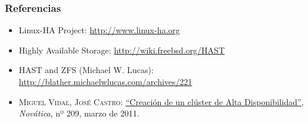 \documentclass{beamer}
\begin{document}
\begin{frame}
\frametitle{Referencias}

\begin{itemize}
\item Linux-HA Project: \href{http://www.linux-ha.org}{http://www.linux-ha.org}
\item Highly Available Storage: \href{http://wiki.freebsd.org/HAST}{http://wiki.freebsd.org/HAST}
\item HAST and ZFS (Michael W. Lucas): \href{http://blather.michaelwlucas.com/archives/221}{http://blather.michaelwlucas.com/archives/221}
\item \textsc{Miguel Vidal, José Castro}: \href{http://www.ati.es/novatica/2011/209/Nv209-75.pdf}{``Creación de un clúster de Alta Disponibilidad''}, \textit{Novática}, nº 209, marzo de 2011. 
\end{itemize}

\end{frame}






\end{document}
